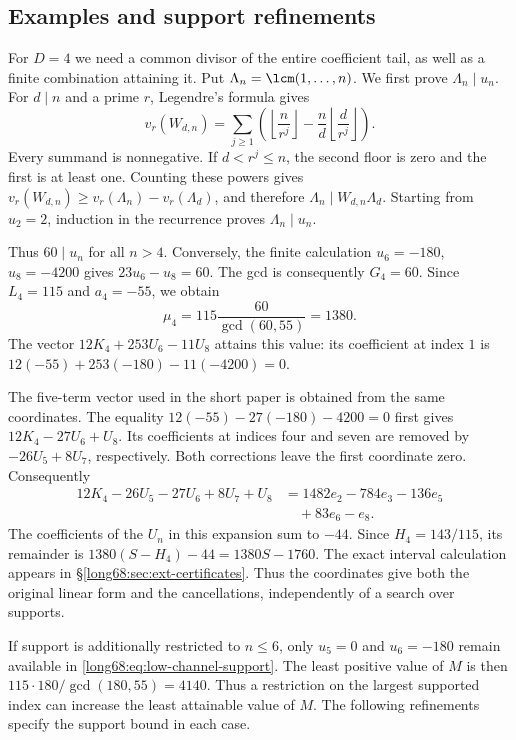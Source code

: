 \subsection{Examples and support refinements}\label{long68:sec:basis-examples}

For $D=4$ we need a common divisor of the entire coefficient tail,
as well as a finite combination attaining it. Put
$\Lambda_n=\lcm(1,\ldots,n)$. We first prove $\Lambda_n\mid u_n$.
For $d\mid n$ and a prime $r$, Legendre's formula gives
\[
 v_r(W_{d,n})=\sum_{j\ge1}
 \left(\left\lfloor\frac n{r^j}\right\rfloor
       -\frac nd\left\lfloor\frac d{r^j}\right\rfloor\right).
\]
Every summand is nonnegative. If $d<r^j\le n$, the second floor
is zero and the first is at least one. Counting these powers gives
$v_r(W_{d,n})\ge v_r(\Lambda_n)-v_r(\Lambda_d)$, and therefore
$\Lambda_n\mid W_{d,n}\Lambda_d$. Starting from $u_2=2$, induction
in the recurrence proves $\Lambda_n\mid u_n$.

Thus $60\mid u_n$ for all $n>4$. Conversely, the finite calculation
$u_6=-180$, $u_8=-4200$ gives $23u_6-u_8=60$. The gcd is consequently
$G_4=60$.
Since $L_4=115$ and $a_4=-55$, we obtain
\[
 \mu_4=115\frac{60}{\gcd(60,55)}=1380.
\]
The vector $12K_4+253U_6-11U_8$ attains this value: its coefficient at
index $1$ is $12(-55)+253(-180)-11(-4200)=0$.

The five-term vector used in the short paper is obtained from the same
coordinates. The equality $12(-55)-27(-180)-4200=0$ first gives
$12K_4-27U_6+U_8$. Its coefficients at indices four and seven are
removed by $-26U_5+8U_7$, respectively. Both corrections leave the first
coordinate zero. Consequently
\begin{equation}
\begin{split}
 12K_4-26U_5-27U_6+8U_7+U_8
 &=1482e_2-784e_3-136e_5\\
 &\quad+83e_6-e_8.
\end{split}
\label{long68:eq:constructed-depth-four}
\end{equation}
The coefficients of the $U_n$ in this expansion sum to $-44$.
Since $H_4=143/115$, its remainder is
$1380(S-H_4)-44=1380S-1760$. The exact interval calculation appears
in \S\ref{long68:sec:ext-certificates}. Thus the coordinates give both
the original linear form and the cancellations, independently of a
search over supports.

If support is additionally restricted to $n\le6$, only $u_5=0$ and
$u_6=-180$ remain available in \eqref{long68:eq:low-channel-support}.
The least positive value of $M$ is then $115\cdot180/\gcd(180,55)=4140$.
Thus a restriction on the largest supported index can increase the
least attainable value of $M$. The following refinements specify the support bound in each case.

